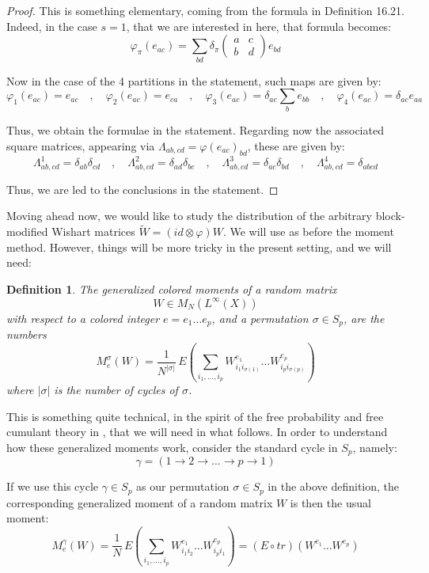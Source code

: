 \documentclass[12pt]{amsbook}
\newtheorem{definition}[theorem]{Definition}
\begin{document}
\begin{proof}
This is something elementary, coming from the formula in Definition 16.21. Indeed, in the case $s=1$, that we are interested in here, that formula becomes:
$$\varphi_\pi(e_{ac})=\sum_{bd}\delta_\pi\begin{pmatrix}a&c\\ b&d\end{pmatrix}e_{bd}$$

Now in the case of the 4 partitions in the statement, such maps are given by:
$$\varphi_1(e_{ac})=e_{ac}\quad,\quad 
\varphi_2(e_{ac})=e_{ca}\quad,\quad 
\varphi_3(e_{ac})=\delta_{ac}\sum_be_{bb}\quad,\quad
\varphi_4(e_{ac})=\delta_{ac}e_{aa}$$

Thus, we obtain the formulae in the statement. Regarding now the associated square matrices, appearing via $\Lambda_{ab,cd}=\varphi(e_{ac})_{bd}$, these are given by:
$$\Lambda^1_{ab,cd}=\delta_{ab}\delta_{cd}\quad,\quad 
\Lambda^2_{ab,cd}=\delta_{ad}\delta_{bc}\quad,\quad
\Lambda^3_{ab,cd}=\delta_{ac}\delta_{bd}\quad,\quad
\Lambda^4_{ab,cd}=\delta_{abcd}$$

Thus, we are led to the conclusions in the statement.
\end{proof}

Moving ahead now, we would like to study the distribution of the arbitrary block-modified Wishart matrices $\widetilde{W}=(id\otimes\varphi)W$. We will use as before the moment method. However, things will be more tricky in the present setting, and we will need:

\begin{definition}
The generalized colored moments of a random matrix 
$$W\in M_N(L^\infty(X))$$
with respect to a colored integer $e=e_1\ldots e_p$, and a permutation $\sigma\in S_p$, are the numbers
$$M^\sigma_e(W)=\frac{1}{N^{|\sigma|}}\,E\left(\sum_{i_1,\ldots,i_p}W^{e_1}_{i_1i_{\sigma(1)}}\ldots W^{e_p}_{i_pi_{\sigma(p)}}\right)$$
where $|\sigma|$ is the number of cycles of $\sigma$.
\end{definition}

This is something quite technical, in the spirit of the free probability and free cumulant theory in \cite{nsp}, that we will need in what follows. In order to understand how these generalized moments work, consider the standard cycle in $S_p$, namely:
$$\gamma=(1\to2\to\ldots\to p\to 1)$$

If we use this cycle $\gamma\in S_p$ as our permutation $\sigma\in S_p$ in the above definition, the corresponding generalized moment of a random matrix $W$ is then the usual moment:
$$M^\gamma_e(W)
=\frac{1}{N}\,E\left(\sum_{i_1,\ldots,i_p}W^{e_1}_{i_1i_2}\ldots W^{e_p}_{i_pi_1}\right)
=(E\circ tr)(W^{e_1}\ldots W^{e_p})$$
\end{document}
